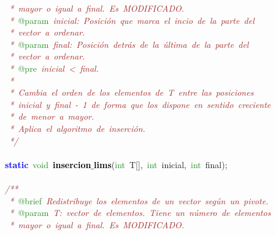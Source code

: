 \mbox{}\textit{\textcolor{Brown}{\ *\ mayor\ o\ igual\ a\ final.\ Es\ MODIFICADO.}} \\
\mbox{}\textit{\textcolor{Brown}{\ *\ }}\textcolor{ForestGreen}{@param}\textit{\textcolor{Brown}{\ inicial:\ Posición\ que\ marca\ el\ incio\ de\ la\ parte\ del}} \\
\mbox{}\textit{\textcolor{Brown}{\ *\ vector\ a\ ordenar.}} \\
\mbox{}\textit{\textcolor{Brown}{\ *\ }}\textcolor{ForestGreen}{@param}\textit{\textcolor{Brown}{\ final:\ Posición\ detrás\ de\ la\ última\ de\ la\ parte\ del}} \\
\mbox{}\textit{\textcolor{Brown}{\ *\ vector\ a\ ordenar.\ }} \\
\mbox{}\textit{\textcolor{Brown}{\ *\ }}\textcolor{ForestGreen}{@pre}\textit{\textcolor{Brown}{\ inicial\ \textless{}\ final.}} \\
\mbox{}\textit{\textcolor{Brown}{\ *\ }} \\
\mbox{}\textit{\textcolor{Brown}{\ *\ Cambia\ el\ orden\ de\ los\ elementos\ de\ T\ entre\ las\ posiciones}} \\
\mbox{}\textit{\textcolor{Brown}{\ *\ inicial\ y\ final\ -\ 1\ de\ forma\ que\ los\ dispone\ en\ sentido\ creciente}} \\
\mbox{}\textit{\textcolor{Brown}{\ *\ de\ menor\ a\ mayor.}} \\
\mbox{}\textit{\textcolor{Brown}{\ *\ Aplica\ el\ algoritmo\ de\ inserción.}} \\
\mbox{}\textit{\textcolor{Brown}{\ */}} \\
\mbox{} \\
\mbox{}\textbf{\textcolor{Blue}{static}}\ \textcolor{ForestGreen}{void}\ \textbf{\textcolor{Black}{insercion$\_$lims}}\textcolor{BrickRed}{(}\textcolor{ForestGreen}{int}\ T\textcolor{BrickRed}{[],}\ \textcolor{ForestGreen}{int}\ inicial\textcolor{BrickRed}{,}\ \textcolor{ForestGreen}{int}\ final\textcolor{BrickRed}{);} \\
\mbox{} \\
\mbox{}\textit{\textcolor{Brown}{/**}} \\
\mbox{}\textit{\textcolor{Brown}{\ *\ }}\textcolor{ForestGreen}{@brief}\textit{\textcolor{Brown}{\ Redistribuye\ los\ elementos\ de\ un\ vector\ según\ un\ pivote.}} \\
\mbox{}\textit{\textcolor{Brown}{\ *\ }}\textcolor{ForestGreen}{@param}\textit{\textcolor{Brown}{\ T:\ vector\ de\ elementos.\ Tiene\ un\ número\ de\ elementos\ }} \\
\mbox{}\textit{\textcolor{Brown}{\ *\ mayor\ o\ igual\ a\ final.\ Es\ MODIFICADO.}} \\
